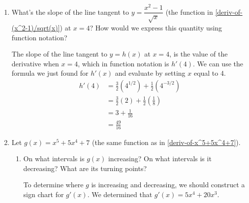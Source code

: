 \documentclass{article}
\begin{document}
\begin{enumerate}[resume]
\begin{enumerate}
  \end{enumerate}

  \pspace{\newpage}

\item 


  \begin{problem}[0.75in]
    What's the slope of the line tangent to $y = \dfrac{x^2 - 1}{\sqrt{x}}$ (the function in \ref{deriv-of-(x^2-1)/sqrt(x)}) at $x = 4$? How would we express this quantity using function notation?
  \end{problem}

  \begin{solution}
    The slope of the line tangent to $y=h(x)$ at $x=4$, is the value of the derivative when $x=4$, which in function notation is $h'(4)$. We can use the
    formula we just found for $h'(x)$ and evaluate by setting $x$ equal to 4.
    \begin{align*}
      h'(4) &= \tfrac{3}{2} (4^{1/2}) + \tfrac{1}{2}(4^{-3/2}) \\
      &= \tfrac{3}{2} (2) + \tfrac{1}{2}(\tfrac{1}{8}) \\
      &= 3 + \tfrac{1}{16} \\
      &= \tfrac{49}{16}
    \end{align*}
     
  \end{solution}

\item  Let $g(x) = x^5 + 5x^4 + 7$ (the same function as in \ref{deriv-of-x^5+5x^4+7}). 

  \begin{enumerate}

  \item
    \begin{problem}[\vfill]
      On what intervals is $g(x)$ increasing?  On what intervals is it
      decreasing? What are its turning points? 
    \end{problem}

    \begin{solution}
      To determine where $g$ is increasing and decreasing, we should construct a 
      sign chart for $g'(x)$. We determined that $g'(x) = 5x^4 + 20x^3$. 
      

\end{solution}
\end{enumerate}
\end{enumerate}
\end{document}
